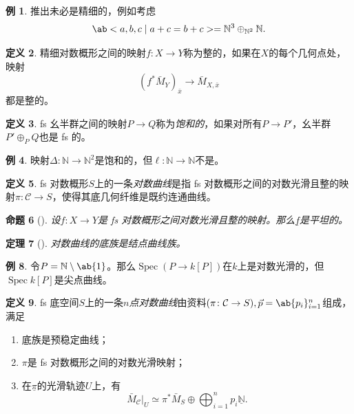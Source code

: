 \documentclass{amsart}
\newtheorem{thm}{定理}[section]
\newtheorem{prop}[thm]{命题}
\theoremstyle{definition}
\newtheorem{defn}[thm]{定义}
\newtheorem{exm}[thm]{例}
\theoremstyle{remark}
\theoremstyle{plain}
\theoremstyle{definition}
\theoremstyle{remark}
\newcommand{\N}{\mathbb{N}}
\newcommand{\mc}[1]{\mathcal{#1}}
\newcommand{\ul}[1]{\underline{#1}}
\newcommand{\1}{\mathbf{1}}
\newcommand{\2}{\mathbf{2}}
\newcommand{\3}{\mathbf{3}}
\DeclareMathOperator{\Spec}{Spec}
\begin{document}
\begin{exm}
    推出未必是精细的，例如考虑
    \[ \ab< a ,b,c \mid a+c=b+c> = \N^3 \oplus_{\N^2} \N. \]
\end{exm}

\begin{defn}
    精细对数概形之间的映射\(f \colon X \to Y\)称为整的，如果在\(X\)的每个几何点处，映射
    \[ (f^*\bar{M}_Y)_{\bar{x}} \to \bar{M}_{X,\bar{x}} \]
    都是整的。
\end{defn}

\begin{defn}
    fs 幺半群之间的映射\(P \to Q\)称为\textit{饱和的}，如果对所有\(P \to P'\)，幺半群\(P' \oplus_P Q\)也是 fs 的。
\end{defn}

\begin{exm}
    映射\(\Delta \colon \N \to \N^2\)是饱和的，但\(\ell \colon \N \to \N\)不是。
\end{exm}

\begin{defn}
    fs 对数概形\(S\)上的一条\textit{对数曲线}是指 fs 对数概形之间的对数光滑且整的映射\(\pi \colon \mc{C} \to S\)，使得其底几何纤维是既约连通曲线。
\end{defn}

\begin{prop}[{\cite{Kato1989}}]
    设\(f \colon X \to Y\)是 fs 对数概形之间对数光滑且整的映射。那么\(\ul{f}\)是平坦的。
\end{prop}

\begin{thm}[{\cite{FKato2000}}]
    对数曲线的底族是结点曲线族。
\end{thm}

\begin{exm}
    令\(P = \N \setminus \ab\{1\}\)。那么\(\Spec (P \to k[P])\)在\(k\)上是对数光滑的，但\(\Spec k[P]\)是尖点曲线。
\end{exm}

\begin{defn}
    fs 底空间\(S\)上的一条\textit{\(n\)点对数曲线}由资料\((\pi \colon \mc{C} \to S), \vec{p} = \ab\{p_i\}_{i=1}^n\)组成，满足
    \begin{enumerate}
        \item 底族是预稳定曲线；
        \item \(\pi\)是 fs 对数概形之间的对数光滑映射；
        \item 在\(\ul{\pi}\)的光滑轨迹\(U\)上，有
            \[ \bar{M}_{\mc{C}}|_U \simeq \pi^* \bar{M}_S \oplus \bigoplus_{i=1}^n p_i \ul{\N}. \]
    \end{enumerate}
\end{defn}
\end{document}
